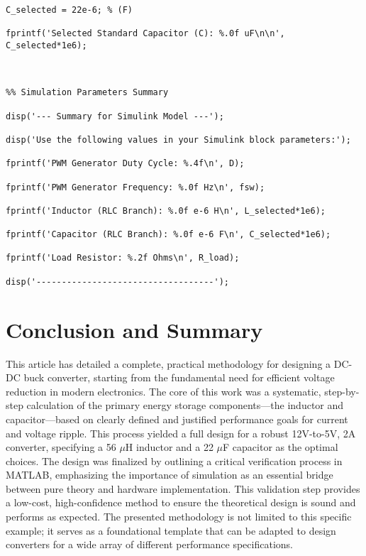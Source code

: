 \documentclass[12pt, a4paper]{article}
\begin{document}
\begin{lstlisting}[caption={MATLAB script for buck converter calculations.}, label={lst:matlab}]
% Choose a standard capacitor value higher than C_min

C_selected = 22e-6; % (F)

fprintf('Selected Standard Capacitor (C): %.0f uF\n\n', C_selected*1e6);



%% Simulation Parameters Summary

disp('--- Summary for Simulink Model ---');

disp('Use the following values in your Simulink block parameters:');

fprintf('PWM Generator Duty Cycle: %.4f\n', D);

fprintf('PWM Generator Frequency: %.0f Hz\n', fsw);

fprintf('Inductor (RLC Branch): %.0f e-6 H\n', L_selected*1e6);

fprintf('Capacitor (RLC Branch): %.0f e-6 F\n', C_selected*1e6);

fprintf('Load Resistor: %.2f Ohms\n', R_load);

disp('-----------------------------------');

\end{lstlisting}



\section{Conclusion and Summary}

This article has detailed a complete, practical methodology for designing a DC-DC buck converter, starting from the fundamental need for efficient voltage reduction in modern electronics. The core of this work was a systematic, step-by-step calculation of the primary energy storage components—the inductor and capacitor—based on clearly defined and justified performance goals for current and voltage ripple. This process yielded a full design for a robust 12V-to-5V, 2A converter, specifying a 56 $\mu$H inductor and a 22 $\mu$F capacitor as the optimal choices. The design was finalized by outlining a critical verification process in MATLAB, emphasizing the importance of simulation as an essential bridge between pure theory and hardware implementation. This validation step provides a low-cost, high-confidence method to ensure the theoretical design is sound and performs as expected. The presented methodology is not limited to this specific example; it serves as a foundational template that can be adapted to design converters for a wide array of different performance specifications.
\end{document}
